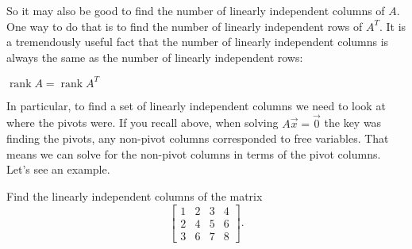 So it may also be good to find the number of linearly independent columns
of $A$.  One way to do that is to find the number of linearly independent
rows of $A^T$.  It is a tremendously useful fact that the number of
linearly independent
columns is always the same as the number of linearly independent rows:

\begin{theorem1}{}
$\operatorname{rank} A = \operatorname{rank} A^T$
\end{theorem1}

In particular, to find a set of linearly independent columns we need to
look at where the pivots were.  If you recall above, when solving $A \vec{x}
= \vec{0}$ the key was finding the pivots, any non-pivot columns corresponded to
free variables.  That means we can solve for the non-pivot columns in terms
of the pivot columns.  Let's see an example. 
\begin{example}
Find the linearly independent columns of the matrix
\begin{equation*}
\begin{bmatrix}
1 & 2 & 3 & 4 \\
2 & 4 & 5 & 6 \\
3 & 6 & 7 & 8
\end{bmatrix} .
\end{equation*}
\end{example}
